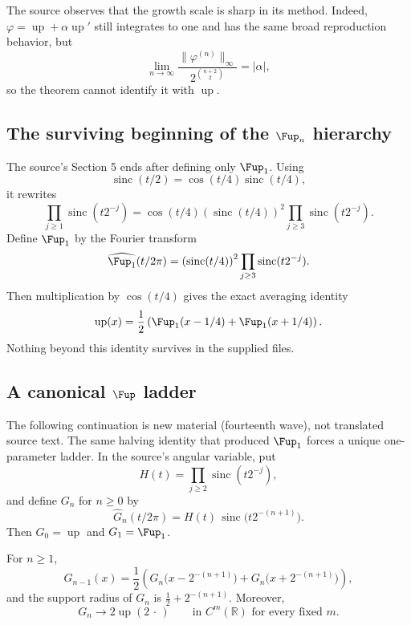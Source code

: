 \documentclass[11pt,oneside]{article}
\numberwithin{equation}{section}
\theoremstyle{definition}
\theoremstyle{remark}
\newcommand{\R}{\mathbb R}
\newcommand{\Up}{\operatorname{up}}
\newcommand{\sinc}{\operatorname{sinc}}
\begin{document}
The source observes that the growth scale is sharp in its method.  Indeed,
$\varphi=\Up+\alpha\Up'$ still integrates to one and has the same broad
reproduction behavior, but
\[
 \lim_{n\to\infty}
 \frac{\|\varphi^{(n)}\|_\infty}
 {2^{\binom{n+2}{2}}}=|\alpha|,
\]
so the theorem cannot identify it with $\Up$.

\subsection{The surviving beginning of the \texorpdfstring{$\Fup_n$}{Fup-n} hierarchy}

The source's Section 5 ends after defining only $\Fup_1$.  Using
\[
 \sinc(t/2)=\cos(t/4)\sinc(t/4),
\]
it rewrites
\[
 \prod_{j\ge1}\sinc(t2^{-j})
 =\cos(t/4)
 \left(\sinc(t/4)\right)^2
 \prod_{j\ge3}\sinc(t2^{-j}).
\]
Define $\Fup_1$ by the Fourier transform
\begin{equation}\label{p6:eq:Fup1}
 \widehat{\Fup_1}(t/2\pi)=
 \left(\sinc(t/4)\right)^2
 \prod_{j\ge3}\sinc(t2^{-j}).
\end{equation}
Then multiplication by $\cos(t/4)$ gives the exact averaging identity
\begin{equation}\label{p6:eq:up-Fup1}
 \Up(x)=\frac12\left(
 \Fup_1(x-1/4)+\Fup_1(x+1/4)
 \right).
\end{equation}
Nothing beyond this identity survives in the supplied files.

\subsection{A canonical \texorpdfstring{$\Fup$}{Fup} ladder}

The following continuation is new material (fourteenth wave), not translated
source text.  The same halving identity that produced $\Fup_1$ forces a unique
one-parameter ladder.  In the source's angular variable, put
\begin{equation}\label{p6:eq:H-tail}
 H(t)=\prod_{j\ge2}\sinc(t2^{-j}),
\end{equation}
and define $G_n$ for $n\ge0$ by
\begin{equation}\label{p6:eq:Gn-hat}
 \widehat G_n(t/2\pi)=H(t)\,\sinc\bigl(t2^{-(n+1)}\bigr).
\end{equation}
Then $G_0=\Up$ and $G_1=\Fup_1$.

\begin{proposition}\label{p6:prop:fup-ladder}
For $n\ge1$,
\begin{equation}\label{p6:eq:Gn-recursion}
 G_{n-1}(x)=\frac12\left(
 G_n\bigl(x-2^{-(n+1)}\bigr)+G_n\bigl(x+2^{-(n+1)}\bigr)
 \right),
\end{equation}
and the support radius of $G_n$ is $\tfrac12+2^{-(n+1)}$.  Moreover,
\begin{equation}\label{p6:eq:Gn-limit}
 G_n\longrightarrow2\Up(2\,\cdot\,)
 \qquad\text{in }C^m(\R)\text{ for every fixed }m.
\end{equation}
\end{proposition}
\end{document}
